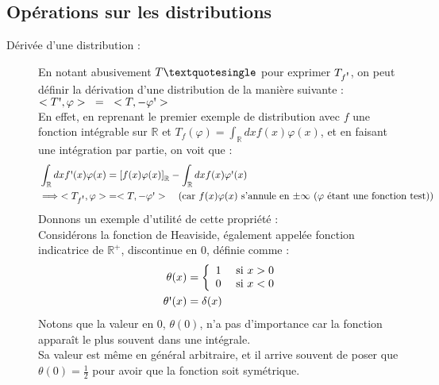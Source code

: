 \documentclass[../notesdecours.tex]{subfiles}
\begin{document}
\subsection{Opérations sur les distributions}

\begin{description}
    \item [Dérivée d'une distribution :] En notant abusivement $T \textquotesingle$ pour exprimer $T_{f \mbox{\textquotesingle}}$, on peut définir la dérivation d'une distribution de la manière suivante : \\
    $<T \mbox{\textquotesingle} , \varphi> \mbox{ } = \mbox{ } <T, -\varphi \mbox{\textquotesingle}> $ \\
    En effet, en reprenant le premier exemple de distribution avec $f$ une fonction intégrable sur $\mathbb{R}$ et $T_f(\varphi) = \int_{\mathbb{R}} dx f(x) \varphi(x)$, 
    et en faisant une intégration par partie, on voit que : \\
    \begin{align}
        \int_{\mathbb{R}} dx f \mbox{\textquotesingle} (x) \varphi(x) &= \left[ f(x) \varphi(x) \right]_{\mathbb{R}} - \int_{\mathbb{R}} dx f(x) \varphi \mbox{\textquotesingle} (x) \notag \\
        \implies <T_{f \mbox{\textquotesingle}}, \varphi> &= <T, - \varphi \mbox{\textquotesingle}> \quad \mbox{(car $f(x) \varphi(x)$ s'annule en $\pm \infty$ ($\varphi$ étant une fonction test)) }\notag 
    \end{align}
    Donnons un exemple d'utilité de cette propriété : \\
    Considérons la fonction de Heaviside, également appelée fonction indicatrice de $\mathbb{R}^+$, discontinue en $0$, définie comme : 
    \begin{align}
    \label{fonction de Heaviside}
        \theta (x) &= \left\lbrace \begin{array}{lll}
                1 \quad \mbox{ si $x>0$} \\
                0 \quad \mbox{ si $x<0$}
                \end{array}\right. \notag \\
        \theta \mbox{\textquotesingle} (x) &= \delta (x)
    \end{align}
    Notons que la valeur en $0$, $\theta (0)$, n'a pas d'importance car la fonction apparaît le plus souvent dans une intégrale. \\
    Sa valeur est même en général arbitraire, et il arrive souvent de poser que $\theta (0) = \frac{1}{2}$ pour avoir que la fonction soit symétrique. \\

\end{description}
\end{document}
